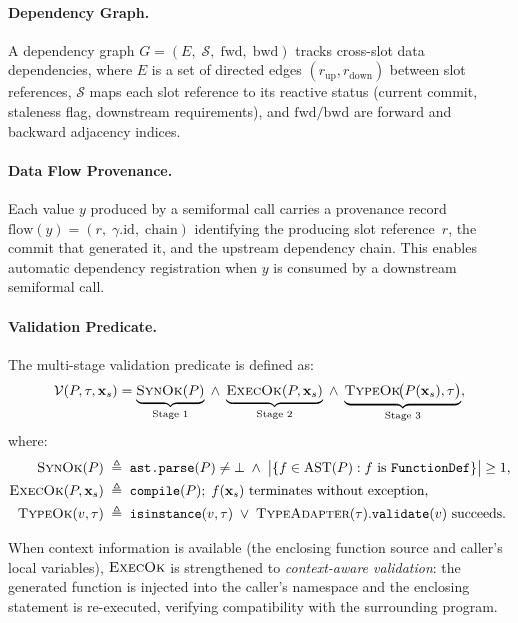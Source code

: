 \paragraph{Dependency Graph.}
A dependency graph
$G = (E,\; \mathcal{S},\; \mathrm{fwd},\; \mathrm{bwd})$ tracks cross-slot
data dependencies, where $E$ is a set of directed edges
$(r_{\mathrm{up}}, r_{\mathrm{down}})$ between slot references, $\mathcal{S}$
maps each slot reference to its reactive status (current commit, staleness
flag, downstream requirements), and $\mathrm{fwd}/\mathrm{bwd}$ are forward
and backward adjacency indices.

\paragraph{Data Flow Provenance.}
Each value $y$ produced by a semiformal call carries a provenance record
$\mathrm{flow}(y) = (r,\; \gamma.\mathrm{id},\; \mathrm{chain})$
identifying the producing slot reference~$r$, the commit that generated it,
and the upstream dependency chain.  This enables automatic dependency
registration when $y$ is consumed by a downstream semiformal call.

\paragraph{Validation Predicate.}
The multi-stage validation predicate is defined as:
\begin{equation}
\label{eq:validation}
\mathcal{V}(P, \tau, \mathbf{x}_s) =
  \underbrace{\textsc{SynOk}(P)}_{\text{Stage 1}}
  \;\wedge\;
  \underbrace{\textsc{ExecOk}(P, \mathbf{x}_s)}_{\text{Stage 2}}
  \;\wedge\;
  \underbrace{\textsc{TypeOk}\!\bigl(P(\mathbf{x}_s), \tau\bigr)}_{\text{Stage 3}},
\end{equation}
where:
\begin{align}
\textsc{SynOk}(P) &\;\triangleq\; \texttt{ast.parse}(P) \neq \bot
  \;\wedge\;
  \bigl|\{f \in \mathrm{AST}(P) : f \text{ is } \texttt{FunctionDef}\}\bigr| \geq 1, \\
\textsc{ExecOk}(P, \mathbf{x}_s) &\;\triangleq\;
  \texttt{compile}(P);\; f(\mathbf{x}_s) \text{ terminates without exception}, \\
\textsc{TypeOk}(v, \tau) &\;\triangleq\;
  \texttt{isinstance}(v, \tau)
  \;\vee\;
  \textsc{TypeAdapter}(\tau).\texttt{validate}(v) \text{ succeeds}.
\end{align}

When context information is available (the enclosing function source and
caller's local variables), $\textsc{ExecOk}$ is strengthened to
\emph{context-aware validation}: the generated function is injected into the
caller's namespace and the enclosing statement is re-executed, verifying
compatibility with the surrounding program.



